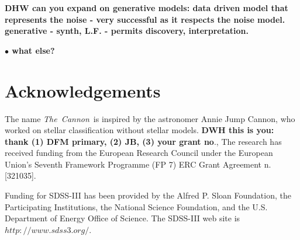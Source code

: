 \documentclass[12pt, preprint]{aastex}
\newcommand{\logg}{\mbox{$\rm \log g$}}
\newcommand{\tc}{\textsl{The~Cannon}}
\begin{document}
\textbf{DHW can you expand on generative models: data driven model that represents the noise -  very successful as it respects the noise model. generative - synth, L.F. - permits discovery, interpretation.}




\textbf{ $\bullet$ what else?} 




\section*{ Acknowledgements}

The name \tc\ is inspired by the astronomer Annie Jump Cannon, who worked on stellar classification without stellar models. \textbf{DWH this is you: thank (1) DFM primary,  (2) JB, (3) your grant no}.,
The research has received funding from the European Research Council under the European
Union's Seventh Framework Programme (FP 7) ERC Grant Agreement n.
[321035]. 

Funding for SDSS-III has been provided by the Alfred P. Sloan Foundation, the Participating Institutions, the National Science Foundation, and the U.S. Department of Energy Office of Science. The SDSS-III web site is $http://www.sdss3.org/.$\\
\end{document}
